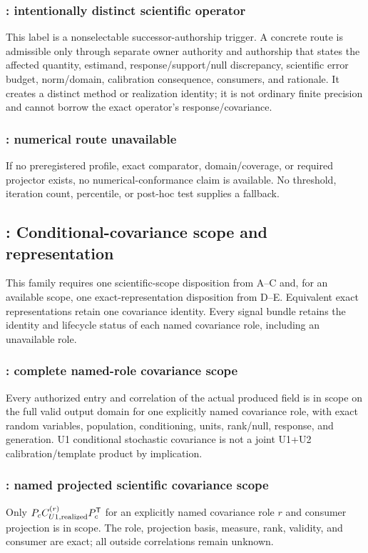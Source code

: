 \subsubsection{: intentionally distinct scientific operator}
This label is a nonselectable successor-authorship trigger. A concrete route is
admissible only through separate owner authority and authorship that states the
affected quantity, estimand, response/support/null discrepancy, scientific
error budget, norm/domain, calibration consequence, consumers, and rationale.
It creates a distinct method or realization identity; it is not ordinary
finite precision and cannot borrow the exact operator's response/covariance.

\subsubsection{: numerical route unavailable}
If no preregistered profile, exact comparator, domain/coverage, or required
projector exists, no numerical-conformance claim is available. No threshold,
iteration count, percentile, or post-hoc test supplies a fallback.

\subsection{: Conditional-covariance scope and representation}

This family requires one scientific-scope disposition from A--C and, for an
available scope, one exact-representation disposition from D--E. Equivalent
exact representations retain one covariance identity. Every signal bundle
retains the identity and lifecycle status of each named covariance role,
including an unavailable role.

\subsubsection{: complete named-role covariance scope}
Every authorized entry and correlation of the actual produced field is in
scope on the full valid output domain for one explicitly named covariance role,
with exact random variables, population, conditioning, units, rank/null,
response, and generation. U1 conditional stochastic covariance is not a joint
U1+U2 calibration/template product by implication.

\subsubsection{: named projected scientific covariance scope}
Only $P_cC_{U1,{\rm realized}}^{(r)}P_c^{\mathsf T}$ for an explicitly named
covariance role $r$ and consumer projection is in scope. The role, projection
basis, measure, rank, validity, and consumer are exact; all outside
correlations remain unknown.

